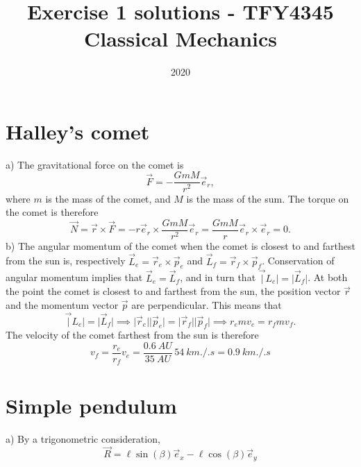 \documentclass{article}
\title{Exercise 1 solutions - TFY4345 Classical Mechanics}
\date{2020}
\begin{document}
    \maketitle
    \section{Halley's comet}
        a) The gravitational force on the comet is
        \begin{equation*}
            \vec F = - \frac{GmM}{r^2} \vec e_r,
        \end{equation*}
        where $m$ is the mass of the comet, and $M$ is the mass of the sum. The torque on the comet is therefore
        \begin{equation*}
            \vec N = \vec r \times \vec F = - r \vec e_r \times \frac{GmM}{r^2} \vec e_r = \frac{GmM}{r} \vec e_r \times \vec e_r = 0. 
        \end{equation*}
         b) The angular momentum of the comet when the comet is closest to and farthest from the sun is, respectively $\vec L_e = \vec r_e \times \vec p_e$ and $\vec L_f = \vec r_f \times \vec p_f$. Conservation of angular momentum implies that $\vec L_e = \vec L_f$, and in turn that $\vec |L_e| = |\vec L_f|$. At both the point the comet is closest to and farthest from the sun, the position vector $\vec r$ and the momentum vector $\vec p$ are perpendicular. This means that
        \begin{equation*}
            \vec |L_e| = |\vec L_f| \implies |\vec r_e || \vec p_e| = |\vec r_f || \vec p_f| \implies r_e m v_e = r_f m v_f.
        \end{equation*}
        The velocity of the comet farthest from the sun is therefore
        \begin{equation*}
            v_f = \frac{r_e}{r_f} v_e = \frac{\SI{0.6}{AU}}{\SI{35}{AU}} \, \SI{54}{km.\per.s} = \SI{0.9}{km.\per.s} 
        \end{equation*}

    \section{Simple pendulum}
        a) By a trigonometric consideration,
        \begin{equation*}
            \vec R = \ell \sin(\beta) \vec e_x - \ell \cos(\beta) \vec e_y
        \end{equation*}
\end{document}
